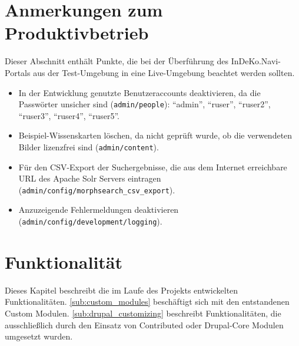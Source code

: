 \section{Anmerkungen zum Produktivbetrieb}\label{sec:live}
Dieser Abschnitt enthält Punkte, die bei der Überführung des InDeKo.Navi-Portals aus der Test-Umgebung in eine Live-Umgebung beachtet werden sollten.

\begin{itemize}
	\item In der Entwicklung genutzte Benutzeraccounts deaktivieren, da die Passwörter unsicher sind (\lstinline|admin/people|): \enquote{admin}, \enquote{ruser}, \enquote{ruser2}, \enquote{ruser3}, \enquote{ruser4}, \enquote{ruser5}.
	
	\item Beispiel-Wissenskarten löschen, da nicht geprüft wurde, ob die verwendeten Bilder lizenzfrei sind (\lstinline|admin/content|).
	
	\item Für den CSV-Export der Suchergebnisse, die aus dem Internet erreichbare URL des Apache Solr Servers eintragen (\lstinline|admin/config/morphsearch_csv_export|).
	
	\item Anzuzeigende Fehlermeldungen deaktivieren (\lstinline|admin/config/development/logging|).
\end{itemize}



\section{Funktionalität}\label{sec:function}
Dieses Kapitel beschreibt die im Laufe des Projekts entwickelten Funktionalitäten. \cref{sub:custom_modules} beschäftigt sich mit den entstandenen Custom Modulen. \cref{sub:drupal_customizing} beschreibt Funktionalitäten, die ausschließlich durch den Einsatz von Contributed oder Drupal-Core Modulen umgesetzt wurden.



